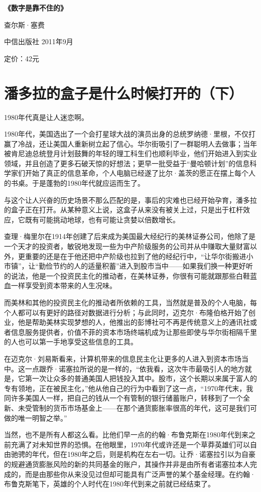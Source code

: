 \textbf{《数字是靠不住的》}

查尔斯·塞费

中信出版社 2011年9月

定价：42元

\section{潘多拉的盒子是什么时候打开的（下）}

1980年代真是让人迷恋啊。

1980年代，美国选出了一个会打星球大战的演员出身的总统罗纳德·里根，不仅打赢了冷战，还让美国人重新树立起了信心。华尔街吸引了一群聪明人去做事；当年被肯尼迪总统登月计划鼓舞的年轻的理工科生们也顺利毕业，他们开始进入到实业领域，并且创造了更多石破天惊的好想法；更早一批受益于``曼哈顿计划''的信息科学家们开始了真正的信息革命，个人电脑已经遂了比尔·盖茨的愿正在摆上每个人的书桌。于是蓬勃的1980年代就应运而生了。

与这个让人兴奋的历史场景不那么匹配的是，事后的灾难也已经开始孕育，潘多拉的盒子正在打开。从某种意义上说，这盒子从来没有被关上过，只是出于杠杆效应，它既有可能挑动地球，也有可能让贪婪以倍数增长。

查理·梅里尔在1914年创建了后来成为美国最大经纪行的美林证券公司，他除了是一个天才的投资者，敏锐地发现一些为中产阶级服务的公司并从中赚取大量财富以外，更重要的还是在于他还把中产阶级也拉到了他的经纪行中，``让华尔街搬进小市镇''，让``勤俭节约的人的适量积蓄''进入到股市当中------如果我们换一种更好听的说法，他是一个投资民主化的推动者，在美林证券，你很有可能就跟那些白鞋蓝血一样享受到资本带来的人生况味。

而美林和其他的投资民主化的推动者所依赖的工具，当然就是普及的个人电脑，每个人都可以有更好的路径对数据进行分析；与此同时，迈克尔·布隆伯格开始了创业，他是帮助美林实现梦想的人，他推出的彭博社可不再是传统意义上的通讯社或者信息服务提供者，价值不菲的资本市场终端机成为让那些即使与华尔街相隔千里的人也可以第一手地享受这些信息的工具。

在迈克尔·刘易斯看来，计算机带来的信息民主化让更多的人进入到资本市场当中。这一点跟乔·诺塞拉所说的是一样的，``依我看，这次牛市最吸引人的地方就是，它第一次让众多的普通美国人把钱投入其中。股市，这个长期以来属于富人的专有领地，正在被民主化，''他从他自己的行为中看到了这一点，``1970年代末，我同许多美国人一样，把自己的钱从一个有管制的银行储蓄账户，转移到了一个全新、未受管制的货币市场基金上------在那个通货膨胀率很高的年代，这可是我们可做的唯一明智之举。''

当然，也不是所有人都这么看。比他们早一点的约翰·布鲁克斯在1980年代到来之前充满了对未知世界的恐惧。在他眼里，1970年代或许还是一个草莽英雄们可以自由驰骋的年代，但在1980年之后，则是机构在左右一切。让乔·诺塞拉引以为自豪的规避通货膨胀风险的新的共同基金的账户，其操作并非是由所有者诺塞拉本人完成的，而是由那些你从来没见过但却可能具有广泛声誉的某个基金经理。在约翰·布鲁克斯笔下，英雄的个人时代在1980年代到来之前就已经结束了。

